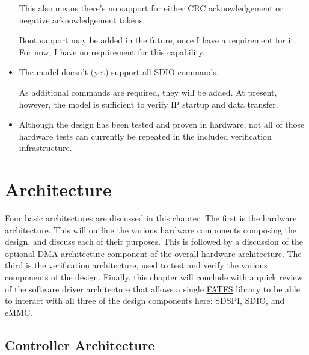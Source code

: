 \documentclass{gqtekspec}
\newcommand{\zhref}[2]{\href{#1}{\textcolor{dkblue}{#2}}}
\begin{document}
\begin{itemize}
	This also means there's no support for either CRC acknowledgement
	or negative acknowledgement tokens.

	Boot support may be added in the future, once I have a requirement
	for it.  For now, I have no requirement for this capability.

\item The model doesn't (yet) support all SDIO commands.

	As additional commands are required, they will be added.  At present,
	however, the model is sufficient to verify IP startup and data
	transfer.

\item Although the design has been tested and proven in hardware, not all
	of those hardware tests can currently be repeated in the included
	verification infrastructure.
\end{itemize}
\chapter{Architecture}\label{ch:arch}
Four basic architectures are discussed in this chapter.  The first is the
hardware architecture.  This will outline the various hardware components
composing the design, and discuss each of their purposes.  This is followed by
a discussion of the optional DMA architecture component of the overall
hardware architecture.  The third is the verification architecture, used to
test and verify the various components of the design.  Finally, this chapter
will conclude with a quick review of the software driver architecture that
allows a single \zhref{http://elm-chan.org/fsw/ff/}{FATFS} library to be able
to interact with all three of the design components here: SDSPI, SDIO, and eMMC.

\section{Controller Architecture}\label{sec:arch-controller}
\end{document}
